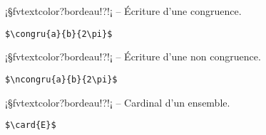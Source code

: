 \documentclass[11pt,a4paper,rgb]{report}
\begin{document}
\setlength{\leftskip}{0pt}
\setlength{\textwidth}{18cm}%


\vspace*{.75cm}

\inCodeStub¡§fvtextcolor?bordeau!?!¡ -- Écriture d'une congruence.

\setlength{\leftskip}{.75cm}%
\setlength{\textwidth}{17.25cm}%

\colorbox{blue!15}{}
\hfill
\begin{minipage}{.65\textwidth}
	\begin{lstlisting}[linewidth=\textwidth, language={[LaTeX]TeX}]
	$\congru{a}{b}{2\pi}$
	\end{lstlisting}
\end{minipage}

\setlength{\leftskip}{0pt}
\setlength{\textwidth}{18cm}%


\vspace*{.75cm}

\inCodeStub¡§fvtextcolor?bordeau!?!¡ -- Écriture d'une non congruence.

\setlength{\leftskip}{.75cm}%
\setlength{\textwidth}{17.25cm}%

\colorbox{blue!15}{}
\hfill
\begin{minipage}{.65\textwidth}
	\begin{lstlisting}[linewidth=\textwidth, language={[LaTeX]TeX}]
	$\ncongru{a}{b}{2\pi}$
	\end{lstlisting}
\end{minipage}

\setlength{\leftskip}{0pt}
\setlength{\textwidth}{18cm}%


\vspace*{.75cm}

\inCodeStub¡§fvtextcolor?bordeau!?!¡ -- Cardinal d'un ensemble.

\setlength{\leftskip}{.75cm}%
\setlength{\textwidth}{17.25cm}%

\colorbox{blue!15}{}
\hfill
\begin{minipage}{.65\textwidth}
	\begin{lstlisting}[linewidth=\textwidth, language={[LaTeX]TeX}]
	$\card{E}$
	\end{lstlisting}
\end{minipage}
\end{document}
